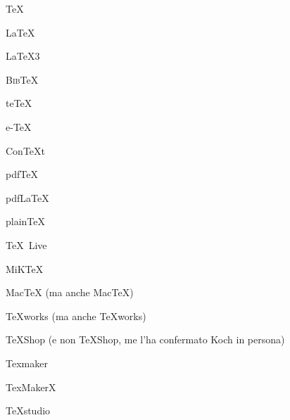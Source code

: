 \documentclass{minimal}
\begin{document}
	
	\TeX{}
	
	\LaTeX{}
	
	\LaTeXe
	
	\LaTeX{}3
	
	\XeTeX{}
	
	\XeLaTeX{}
	
	\LuaTeX{}
	
	\LuaLaTeX{}
	
	\textsc{Bib}\TeX{}
	
	te\TeX{}
	
	e-\TeX{}
	
	Con\TeX{}t
	
	pdf\TeX{}
	
	pdf\LaTeX{}
	
	plain\TeX{}
	
	\MF{}
	
	\MP{}
	
	\AmS{}
	
	\GuIT{}
	
	\GuIT*{}
	
	\Ars{}
	
	\TeX{}~Live
	
	MiK\TeX{}
	
	Mac\TeX{} (ma anche MacTeX)
	
	TeXworks (ma anche \TeX{}works)
	
	TeXShop (e non \TeX{}Shop, me l'ha confermato Koch in persona)
	
	Texmaker
	
	TexMakerX
	
	TeXstudio
	
\end{document}
